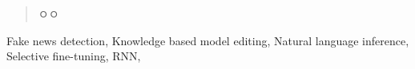\documentclass[a4paper,fleqn]{cas-sc}
\begin{document}
\begin{abstract}
ㅇㅇ
\end{abstract}



\begin{keywords}
 Fake news detection\sep
 Knowledge based model editing\sep
 Natural language inference\sep
 Selective fine-tuning\sep
 RNN\sep
\end{keywords}

\maketitle
\end{document}
